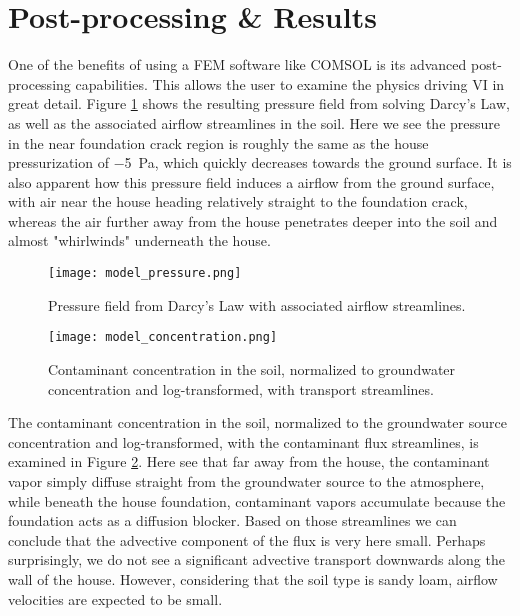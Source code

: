 \section{Post-processing \& Results}

One of the benefits of using a FEM software like COMSOL is its advanced post-processing capabilities.
This allows the user to examine the physics driving VI in great detail.
Figure \ref{fig:model_pressure} shows the resulting pressure field from solving Darcy's Law, as well as the associated airflow streamlines in the soil.
Here we see the pressure in the near foundation crack region is roughly the same as the house pressurization of \SI{-5}{\pascal}, which quickly decreases towards the ground surface.
It is also apparent how this pressure field induces a airflow from the ground surface, with air near the house heading relatively straight to the foundation crack, whereas the air further away from the house penetrates deeper into the soil and almost "whirlwinds" underneath the house.\par

\begin{figure}[htb!]
  \centering
  \texttt{[image: model\_pressure.png]}
  \caption[Modeled Darcy's pressure field in soil]{Pressure field from Darcy's Law with associated airflow streamlines.}
  \label{fig:model_pressure}
\end{figure}

\begin{figure}[htb!]
  \centering
  \texttt{[image: model\_concentration.png]}
  \caption[Modeled contaminant concentration in soil]{Contaminant concentration in the soil, normalized to groundwater concentration and log-transformed, with transport streamlines.}
  \label{fig:model_concentration}
\end{figure}

The contaminant concentration in the soil, normalized to the groundwater source concentration and log-transformed, with the contaminant flux streamlines, is examined in Figure \ref{fig:model_concentration}.
Here see that far away from the house, the contaminant vapor simply diffuse straight from the groundwater source to the atmosphere, while beneath the house foundation, contaminant vapors accumulate because the foundation acts as a diffusion blocker.
Based on those streamlines we can conclude that the advective component of the flux is very here small.
Perhaps surprisingly, we do not see a significant advective transport downwards along the wall of the house.
However, considering that the soil type is sandy loam, airflow velocities are expected to be small.\par

